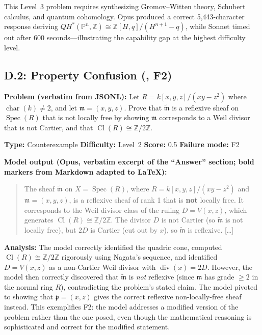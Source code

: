 This Level~3 problem requires synthesizing Gromov--Witten theory, Schubert calculus, and quantum cohomology.
Opus produced a correct 5{,}443-character response deriving $QH^*(\mathbb{P}^n, \mathbb{Z}) \cong \mathbb{Z}[H, q]/(H^{n+1} - q)$, while Sonnet timed out after 600 seconds---illustrating the capability gap at the highest difficulty level.

\subsection*{D.2: Property Confusion (, F2)}

\textbf{Problem (verbatim from JSONL):} Let $R = k[x,y,z]/(xy - z^2)$ where $\operatorname{char}(k) \neq 2$, and let $\mathfrak{m} = (x,y,z)$. Prove that $\widetilde{\mathfrak{m}}$ is a reflexive sheaf on $\operatorname{Spec}(R)$ that is not locally free by showing $\mathfrak{m}$ corresponds to a Weil divisor that is not Cartier, and that $\operatorname{Cl}(R) \cong \mathbb{Z}/2\mathbb{Z}$.

\textbf{Type:} Counterexample \quad \textbf{Difficulty:} Level~2 \quad \textbf{Score:} 0.5 \quad \textbf{Failure mode:} F2

\textbf{Model output (Opus, verbatim excerpt of the ``Answer'' section; bold markers from Markdown adapted to \LaTeX):}

\begin{quote}
\small
The sheaf $\widetilde{\mathfrak{m}}$ on $X = \operatorname{Spec}(R)$, where $R = k[x,y,z]/(xy - z^2)$ and $\mathfrak{m} = (x,y,z)$, is a reflexive sheaf of rank 1 that is \textbf{not} locally free. It corresponds to the Weil divisor class of the ruling $D = V(x,z)$, which generates $\operatorname{Cl}(R) \cong \mathbb{Z}/2\mathbb{Z}$. The divisor $D$ is not Cartier (so $\widetilde{\mathfrak{m}}$ is not locally free), but $2D$ is Cartier (cut out by $x$), so $\widetilde{\mathfrak{m}}$ is reflexive. [\ldots]
\end{quote}

\textbf{Analysis:} The model correctly identified the quadric cone, computed $\operatorname{Cl}(R) \cong \mathbb{Z}/2\mathbb{Z}$ rigorously using Nagata's sequence, and identified $D = V(x,z)$ as a non-Cartier Weil divisor with $\operatorname{div}(x) = 2D$.
However, the model then correctly discovered that $\widetilde{\mathfrak{m}}$ is \emph{not} reflexive (since $\mathfrak{m}$ has grade $\geq 2$ in the normal ring $R$), contradicting the problem's stated claim.
The model pivoted to showing that $\mathfrak{p} = (x,z)$ gives the correct reflexive non-locally-free sheaf instead.
This exemplifies F2: the model addresses a modified version of the problem rather than the one posed, even though the mathematical reasoning is sophisticated and correct for the modified statement.

